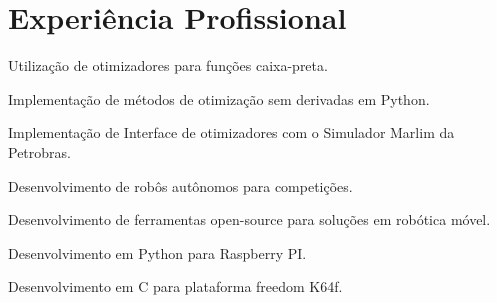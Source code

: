 \documentclass[A4]{deedy-resume} %
\begin{document}
\begin{minipage}[t]{0.66\textwidth} %



\section{Experiência Profissional}

\vspace{\topsep} %
\vspace{\topsep} %
\begin{tightitemize}
 \item Utilização de otimizadores para funções caixa-preta.
 \item Implementação de métodos de otimização sem derivadas em Python.
 \item Implementação de Interface de otimizadores com o Simulador Marlim da Petrobras. 

\end{tightitemize}
\sectionspace %


\vspace{\topsep} %
\begin{tightitemize}
 \item Desenvolvimento de robôs autônomos para competições.
 \item Desenvolvimento de ferramentas open-source para soluções em robótica móvel.
\end{tightitemize}

\sectionspace %

\vspace{\topsep} %
\begin{tightitemize}
 \item Desenvolvimento em Python para Raspberry PI.
 \item Desenvolvimento em C para plataforma freedom K64f.
\end{tightitemize}




\end{minipage}
\end{document}
